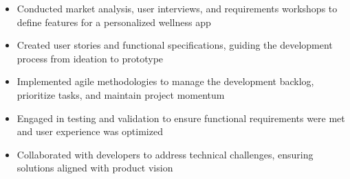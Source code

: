 \par\smallskip
\noindent
\begin{minipage}{20cm}
  \begin{minipage}{9.75cm}
    \begin{itemize}
      \item Conducted market analysis, user interviews, and requirements workshops to define features for a personalized wellness app
      \item Created user stories and functional specifications, guiding the development process from ideation to prototype
      \item Implemented agile methodologies to manage the development backlog, prioritize tasks, and maintain project momentum
    \end{itemize}
  \end{minipage}
  \hfill
  \begin{minipage}{9.75cm}
    \begin{itemize}
      \item Engaged in testing and validation to ensure functional requirements were met and user experience was optimized
      \item Collaborated with developers to address technical challenges, ensuring solutions aligned with product vision
    \end{itemize}
  \end{minipage}
\end{minipage}
\par\smallskip
\divider

